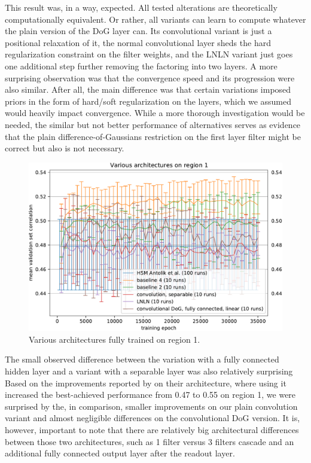 This result was, in a way, expected. All tested alterations are theoretically computationally equivalent. Or rather, all variants can learn to compute whatever the plain version of the DoG layer can. Its convolutional variant is just a positional relaxation of it, the normal convolutional layer sheds the hard regularization constraint on the filter weights, and the LNLN variant just goes one additional step further removing the factoring into two layers. A more surprising observation was that the convergence speed and its progression were also similar. After all, the main difference was that certain variations imposed priors in the form of hard/soft regularization on the layers, which we assumed would heavily impact convergence. While a more thorough investigation would be needed, the similar but not better performance of alternatives serves as evidence that the plain difference-of-Gaussians restriction on the first layer filter might be correct but also is not necessary.

\begin{figure}[H]
    \centering
    \includegraphics[width=1\textwidth]{../figures/05_3_2_1_1}
    \caption[Various architectures on region 1]{Various architectures fully trained on region 1.}
    \label{fig:5.3.2.1_1}
\end{figure}

The small observed difference between the variation with a fully connected hidden layer and a variant with a separable layer was also relatively surprising Based on the improvements reported by \cite{klindt} on their architecture, where using it increased the best-achieved performance from 0.47 to 0.55 on region 1, we were surprised by the, in comparison, smaller improvements on our plain convolution variant and almost negligible differences on the convolutional DoG version. It is, however, important to note that there are relatively big architectural differences between those two architectures, such as 1 filter versus 3 filters cascade and an additional fully connected output layer after the readout layer.

